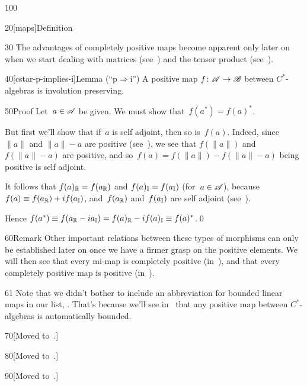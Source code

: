 \begin{parsec}{100}
\begin{point}{20}[maps]{Definition}
\begin{point}{30}
The advantages of completely positive maps
become apparent
only later on 
when we start dealing with matrices (see~)
and the tensor product (see~).
\end{point}
\end{point}
\begin{point}{40}[cstar-p-implies-i]{Lemma (``p$\Rightarrow$i'')}
A positive map $f\colon \mathscr{A}\to\mathscr{B}$ between
$C^*$-algebras is involution preserving.
\begin{point}{50}{Proof}%
Let~$a\in \mathscr{A}$ be given. We must show that~$f(a^*)=f(a)^*$.

But first we'll show that if~$a$ is self adjoint,
then so is~$f(a)$.
Indeed, since $\|a\|$ and $\|a\|-a$ are positive (see~),
we see that $f(\|a\|)$ and $f(\|a\|-a)$ are positive,
and so~$f(a)=f(\|a\|)-f(\|a\|-a)$ being positive is self adjoint.

It follows that $f(a)_{\mathbb{R}}=f(a_{\mathbb{R}})$
and $f(a)_{\mathbb{I}}=f(a_{\mathbb{I}})$ (for~$a\in\mathscr{A}$),
because $f(a)\equiv f(a_{\mathbb{R}})+if(a_{\mathbb{I}})$,
and~$f(a_{\mathbb{R}})$ and~$f(a_{\mathbb{I}})$
are self adjoint
(see~).

Hence $f(a^*)\equiv f(a_{\mathbb{R}}-ia_{\mathbb{I}})
=f(a)_{\mathbb{R}}-if(a)_{\mathbb{I}}\equiv f(a)^*$.\qed
\end{point}
\end{point}
\begin{point}{60}{Remark}%
Other important relations between these types of morphisms
can only be established later on
once we have a firmer grasp on the positive elements.
We will then see  
that every mi-map 
is completely positive (in~),
and that every completely positive map is positive 
(in~).
\begin{point}{61}%
Note that we didn't bother to include
an abbreviation for bounded linear maps in our list, .
That's because we'll see in~ that any positive
map between $C^*$-algebras is automatically bounded.
\end{point}
\end{point}
\begin{point}{70}{[Moved to~.]}%
\end{point}
\begin{point}{80}{[Moved to~.]}%
\begin{point}{90}{[Moved to~.]}%
\end{point}%
\end{point}%
\end{parsec}%
